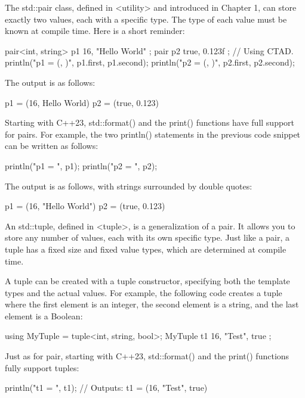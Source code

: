 
The std::pair class, defined in <utility> and introduced in Chapter 1, can store exactly two values, each with a specific type. The type of each value must be known at compile time. Here is a short reminder:

\begin{cpp}
pair<int, string> p1 { 16, "Hello World" };
pair p2 { true, 0.123f }; // Using CTAD.
println("p1 = ({}, {})", p1.first, p1.second);
println("p2 = ({}, {})", p2.first, p2.second);
\end{cpp}

The output is as follows:

\begin{shell}
p1 = (16, Hello World)
p2 = (true, 0.123)
\end{shell}

Starting with C++23, std::format() and the print() functions have full support for pairs. For example, the two println() statements in the previous code snippet can be written as follows:

\begin{cpp}
println("p1 = {}", p1);
println("p2 = {}", p2);
\end{cpp}

The output is as follows, with strings surrounded by double quotes:

\begin{shell}
p1 = (16, "Hello World")
p2 = (true, 0.123)
\end{shell}

An std::tuple, defined in <tuple>, is a generalization of a pair. It allows you to store any number of values, each with its own specific type. Just like a pair, a tuple has a fixed size and fixed value types, which are determined at compile time.

A tuple can be created with a tuple constructor, specifying both the template types and the actual values. For example, the following code creates a tuple where the first element is an integer, the second element is a string, and the last element is a Boolean:

\begin{cpp}
using MyTuple = tuple<int, string, bool>;
MyTuple t1 { 16, "Test", true };
\end{cpp}

Just as for pair, starting with C++23, std::format() and the print() functions fully support tuples:

\begin{cpp}
println("t1 = {}", t1);
// Outputs: t1 = (16, "Test", true)
\end{cpp}

